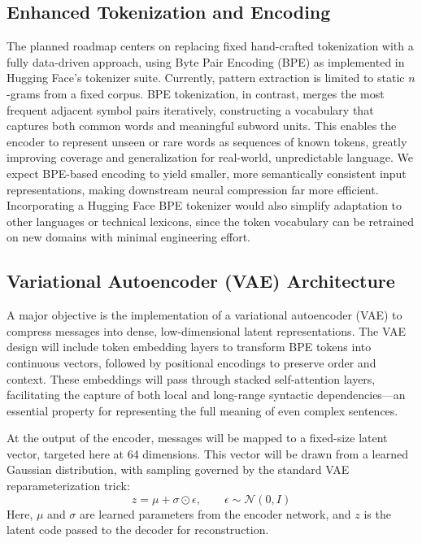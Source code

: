 \documentclass[12pt,openany]{article}
\theoremstyle{definition}
\theoremstyle{definition}
\theoremstyle{definition}
\begin{document}
\subsection*{Enhanced Tokenization and Encoding}

The planned roadmap centers on replacing fixed hand-crafted tokenization with a fully data-driven approach, using Byte Pair Encoding (BPE) as implemented in Hugging Face’s tokenizer suite. Currently, pattern extraction is limited to static $n$-grams from a fixed corpus. BPE tokenization, in contrast, merges the most frequent adjacent symbol pairs iteratively, constructing a vocabulary that captures both common words and meaningful subword units. This enables the encoder to represent unseen or rare words as sequences of known tokens, greatly improving coverage and generalization for real-world, unpredictable language. We expect BPE-based encoding to yield smaller, more semantically consistent input representations, making downstream neural compression far more efficient. Incorporating a Hugging Face BPE tokenizer would also simplify adaptation to other languages or technical lexicons, since the token vocabulary can be retrained on new domains with minimal engineering effort.

\subsection*{Variational Autoencoder (VAE) Architecture}

A major objective is the implementation of a variational autoencoder (VAE) to compress messages into dense, low-dimensional latent representations. The VAE design will include token embedding layers to transform BPE tokens into continuous vectors, followed by positional encodings to preserve order and context. These embeddings will pass through stacked self-attention layers, facilitating the capture of both local and long-range syntactic dependencies—an essential property for representing the full meaning of even complex sentences.

At the output of the encoder, messages will be mapped to a fixed-size latent vector, targeted here at 64 dimensions. This vector will be drawn from a learned Gaussian distribution, with sampling governed by the standard VAE reparameterization trick:
\[
z = \mu + \sigma \odot \epsilon, \qquad \epsilon \sim \mathcal{N}(0, I)
\]
Here, $\mu$ and $\sigma$ are learned parameters from the encoder network, and $z$ is the latent code passed to the decoder for reconstruction.
\end{document}
